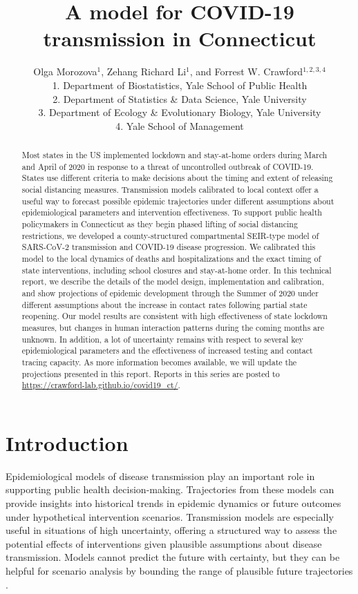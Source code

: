 \documentclass[11pt]{article}
\title{A model for COVID-19 transmission in Connecticut}
\author{Olga Morozova$^{1}$,
  Zehang Richard Li$^1$,
and Forrest W. Crawford$^{1,2,3,4}$  \\[1em]
\small 1. Department of Biostatistics, Yale School of Public Health \\
\small 2. Department of Statistics \& Data Science, Yale University \\
\small 3. Department of Ecology \& Evolutionary Biology, Yale University \\
\small 4. Yale School of Management }
\begin{document}
\maketitle


\begin{abstract}
Most states in the US implemented lockdown and stay-at-home orders during March and April of 2020 in response to a threat of uncontrolled outbreak of COVID-19. 
States use different criteria to make decisions about the timing and extent of releasing social distancing measures. 
Transmission models calibrated to local context offer a useful way to forecast possible epidemic trajectories under different assumptions about epidemiological parameters and intervention effectiveness.  
To support public health policymakers in Connecticut as they begin phased lifting of social distancing restrictions, we developed a county-structured compartmental SEIR-type model of SARS-CoV-2 transmission and COVID-19 disease progression. We calibrated this model to the local dynamics of deaths and hospitalizations and the exact timing of state interventions, including school closures and stay-at-home order. 
In this technical report, we describe the details of the model design, implementation and calibration, and show projections of epidemic development through the Summer of 2020 under different assumptions about the increase in contact rates following partial state reopening.  Our model results are consistent with high effectiveness of state lockdown measures, but changes in human interaction patterns during the coming months are unknown.
In addition, a lot of uncertainty remains with respect to several key epidemiological parameters and the effectiveness of increased testing and contact tracing capacity. 
As more information becomes available, we will update the projections presented in this report. Reports in this series are posted to \url{https://crawford-lab.github.io/covid19_ct/}.
\end{abstract}



\section{Introduction}


Epidemiological models of disease transmission play an important role in supporting public health decision-making. Trajectories from these models can provide insights into historical trends in epidemic dynamics or future outcomes under hypothetical intervention scenarios. 
Transmission models are especially useful in situations of high uncertainty, offering a structured way to assess the potential effects of interventions given plausible assumptions about disease transmission.  Models cannot predict the future with certainty, but they can be helpful for scenario analysis by bounding the range of plausible future trajectories \citep{holmdahl2020wrong}. 
\end{document}
